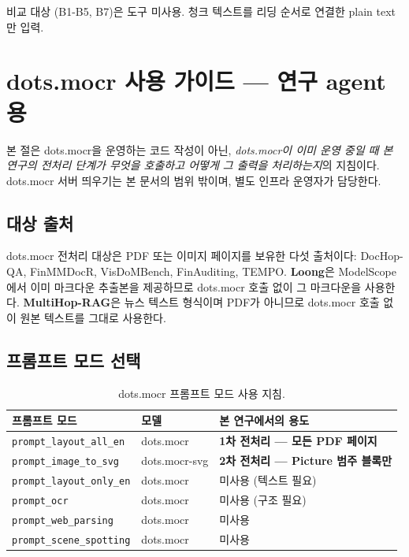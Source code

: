 \documentclass[11pt]{article}
\begin{document}
비교 대상 (B1-B5, B7)은 도구 미사용. 청크 텍스트를 리딩 순서로 연결한 plain text만 입력.

\section{dots.mocr 사용 가이드 — 연구 agent용}
\label{sec:dotsmocr}

본 절은 dots.mocr을 운영하는 코드 작성이 아닌, \emph{dots.mocr이 이미 운영 중일 때 본 연구의 전처리 단계가 무엇을 호출하고 어떻게 그 출력을 처리하는지}의 지침이다. dots.mocr 서버 띄우기는 본 문서의 범위 밖이며, 별도 인프라 운영자가 담당한다.

\subsection{대상 출처}

dots.mocr 전처리 대상은 PDF 또는 이미지 페이지를 보유한 다섯 출처이다: DocHop-QA, FinMMDocR, VisDoMBench, FinAuditing, TEMPO. \textbf{Loong}은 ModelScope에서 이미 마크다운 추출본을 제공하므로 dots.mocr 호출 없이 그 마크다운을 사용한다. \textbf{MultiHop-RAG}은 뉴스 텍스트 형식이며 PDF가 아니므로 dots.mocr 호출 없이 원본 텍스트를 그대로 사용한다.

\subsection{프롬프트 모드 선택}

\begin{table}[h]
\centering
\small
\begin{tabular}{lll}
\toprule
프롬프트 모드 & 모델 & 본 연구에서의 용도 \\
\midrule
\texttt{prompt\_layout\_all\_en} & dots.mocr & \textbf{1차 전처리 — 모든 PDF 페이지} \\
\texttt{prompt\_image\_to\_svg} & dots.mocr-svg & \textbf{2차 전처리 — Picture 범주 블록만} \\
\texttt{prompt\_layout\_only\_en} & dots.mocr & 미사용 (텍스트 필요) \\
\texttt{prompt\_ocr} & dots.mocr & 미사용 (구조 필요) \\
\texttt{prompt\_web\_parsing} & dots.mocr & 미사용 \\
\texttt{prompt\_scene\_spotting} & dots.mocr & 미사용 \\
\bottomrule
\end{tabular}
\caption{dots.mocr 프롬프트 모드 사용 지침.}
\end{table}
\end{document}
